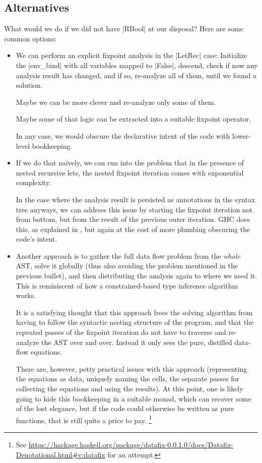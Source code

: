 \documentclass[manuscript,review,screen,acmsmall]{acmart}
\begin{document}

\subsection{Alternatives}
What would we do if we did not have |RBool| at our disposal? Here are some common options:
\begin{itemize}
\item We can perform an explicit fixpoint analysis in the |LetRec| case: Initialize the |env_bind| with all variables mapped to |False|, descend, check if now any analysis result has changed, and if so, re-analyze all of them, until we found a solution.

Maybe we can be more clever and re-analyze only some of them.

Maybe some of that logic can be extracted into a suitable fixpoint operator.

In any case, we would obscure the declarative intent of the code with lower-level bookkeeping.

\item If we do that naively, we can run into the problem that in the presence of nested recursive lets, the nested fixpoint iteration comes with exponential complexity.

In the case where the analysis result is persisted as annotations in the syntax tree anyways, we can address this issue by starting the fixpoint iteration not from bottom, but from the result of the previous outer iteration.
%
GHC does this, as explained in \citet[Section 6.6]{modular}, but again at the cost of more plumbing obscuring the code's intent.

\item Another approach is to gather the full data flow problem from the \emph{whole} AST, solve it globally (thus also avoiding the problem mentioned in the previous bullet), and then distributing the analysis again to where we need it. This is reminiscent of how a constrained-based type inference algorithm works.

It is a satisfying thought that this approach frees the solving algorithm from having to follow the syntactic nesting structure of the program, and that the repeated passes of the fixpoint iteration do not have to traverse and re-analyze the AST over and over. Instead it only sees the pure, distilled data-flow equations.

There are, however, petty practical issues with this approach (representing the equations as data, uniquely naming the cells, the separate passes for collecting the equations and using the results).
At this point, one is likely going to hide this bookkeeping in a suitable monad, which can recover some of the lost elegance, but if the code could otherwise be written as pure functions, that is still quite a price to pay.%
\footnote{See \url{https://hackage.haskell.org/package/datafix-0.0.1.0/docs/Datafix-Denotational.html\#v:datafix} for an attempt.}
\end{itemize}
\end{document}
